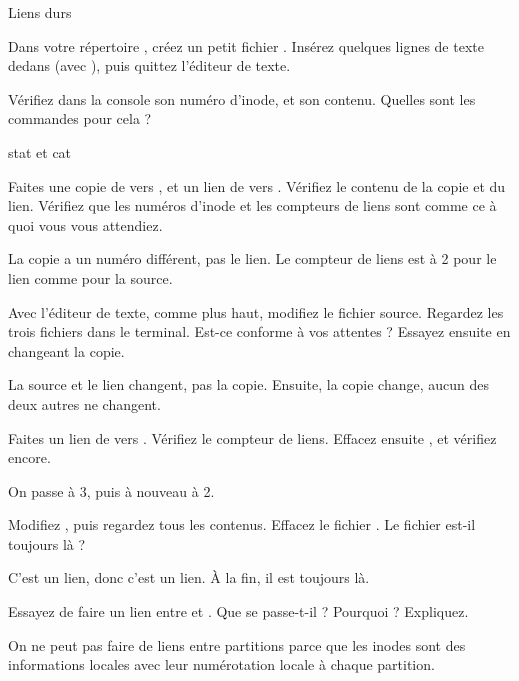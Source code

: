 \begin{exercice}
  \begin{exercicelet}{Liens durs}
    \begin{questions}
    \item Dans votre répertoire , créez
      un petit fichier . Insérez quelques lignes de
      texte dedans (avec ), puis quittez l'éditeur
      de texte.
    \item Vérifiez dans la console son numéro d'inode, et son
      contenu. Quelles sont les commandes pour cela ?
      \begin{correction}
        stat et cat
      \end{correction}
    \item Faites une copie de  vers , et
      un lien de  vers . Vérifiez le
      contenu de la copie et du lien. Vérifiez que les numéros d'inode
      et les compteurs de liens sont comme ce à quoi vous vous
      attendiez.
      \begin{correction}
        La copie a un numéro différent, pas le lien. Le compteur de
        liens est à 2 pour le lien comme pour la source.
      \end{correction}
    \item Avec l'éditeur de texte, comme plus haut, modifiez le fichier
      source. Regardez les trois fichiers dans le terminal. Est-ce
      conforme à vos attentes ? Essayez ensuite en changeant la copie.
      \begin{correction}
        La source et le lien changent, pas la copie. Ensuite, la copie
        change, aucun des deux autres ne changent.
      \end{correction}
    \item Faites un lien de  vers
      . Vérifiez le compteur de liens. Effacez ensuite
      , et vérifiez encore.
      \begin{correction}
        On passe à 3, puis à nouveau à 2.
      \end{correction}
    \item Modifiez , puis regardez tous les
      contenus. Effacez le fichier . Le fichier
       est-il toujours là ?
      \begin{correction}
        C'est un lien, donc c'est un lien. À la fin, il est toujours là.
      \end{correction}
    \item Essayez de faire un lien entre  et
      . Que se passe-t-il ? Pourquoi ? Expliquez.
      \begin{correction}
        On ne peut pas faire de liens entre partitions parce que les
        inodes sont des informations locales avec leur numérotation
        locale à chaque partition.
      \end{correction}
    \end{questions}
  \end{exercicelet}
\end{exercice}


